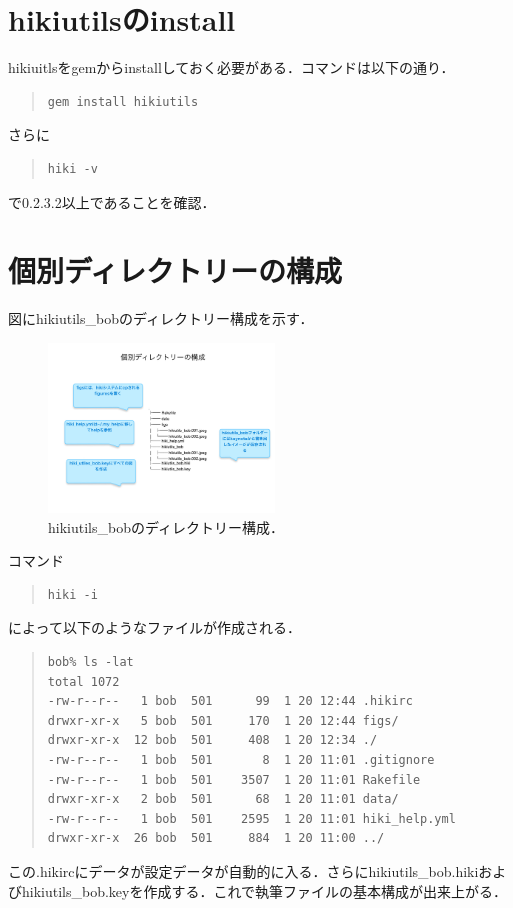 \documentclass[12pt,a4paper]{jsarticle}
\begin{document}
\section{hikiutilsのinstall}
hikiuitlsをgemからinstallしておく必要がある．コマンドは以下の通り．
\begin{quote}\begin{verbatim}
gem install hikiutils
\end{verbatim}\end{quote}
さらに
\begin{quote}\begin{verbatim}
hiki -v
\end{verbatim}\end{quote}
で0.2.3.2以上であることを確認．

\section{個別ディレクトリーの構成}
図にhikiutils\_bobのディレクトリー構成を示す．

\begin{figure}[htbp]\begin{center}
\includegraphics[width=6cm,bb=0 0 442 500]{./hikiutils_bob.003.jpeg}
\caption{hikiutils\_bobのディレクトリー構成．}
\label{default}\end{center}\end{figure}
コマンド
\begin{quote}\begin{verbatim}
hiki -i
\end{verbatim}\end{quote}
によって以下のようなファイルが作成される．
\begin{quote}\begin{verbatim}
bob% ls -lat
total 1072
-rw-r--r--   1 bob  501      99  1 20 12:44 .hikirc
drwxr-xr-x   5 bob  501     170  1 20 12:44 figs/
drwxr-xr-x  12 bob  501     408  1 20 12:34 ./
-rw-r--r--   1 bob  501       8  1 20 11:01 .gitignore
-rw-r--r--   1 bob  501    3507  1 20 11:01 Rakefile
drwxr-xr-x   2 bob  501      68  1 20 11:01 data/
-rw-r--r--   1 bob  501    2595  1 20 11:01 hiki_help.yml
drwxr-xr-x  26 bob  501     884  1 20 11:00 ../
\end{verbatim}\end{quote}
この.hikircにデータが設定データが自動的に入る．さらにhikiutils\_bob.hikiおよびhikiutils\_bob.keyを作成する．これで執筆ファイルの基本構成が出来上がる．
\end{document}
